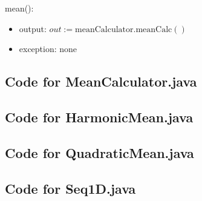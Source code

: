 \documentclass[12pt,fleqn]{examtst}
\begin{document}
\noindent mean():
\begin{itemize}
\item output: $\mathit{out} := \mbox{meanCalculator.meanCalc}()$
\item exception: none
\end{itemize}


\newpage

\subsection*{Code for MeanCalculator.java}

\noindent 

\newpage

\subsection*{Code for HarmonicMean.java}

\noindent 

\newpage

\subsection*{Code for QuadraticMean.java}

\noindent 

\newpage

\subsection*{Code for Seq1D.java}

\noindent 

\end{document}
